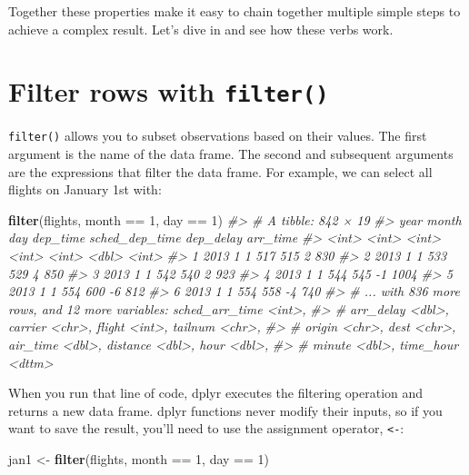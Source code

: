 \documentclass[]{book}
\newenvironment{Shaded}{\begin{snugshade}}{\end{snugshade}}
\newcommand{\KeywordTok}[1]{\textcolor[rgb]{0.13,0.29,0.53}{\textbf{{#1}}}}
\newcommand{\DecValTok}[1]{\textcolor[rgb]{0.00,0.00,0.81}{{#1}}}
\newcommand{\StringTok}[1]{\textcolor[rgb]{0.31,0.60,0.02}{{#1}}}
\newcommand{\CommentTok}[1]{\textcolor[rgb]{0.56,0.35,0.01}{\textit{{#1}}}}
\newcommand{\NormalTok}[1]{{#1}}
\begin{document}
Together these properties make it easy to chain together multiple simple
steps to achieve a complex result. Let's dive in and see how these verbs
work.

\section{\texorpdfstring{Filter rows with
\texttt{filter()}}{Filter rows with filter()}}\label{filter-rows-with-filter}

\texttt{filter()} allows you to subset observations based on their
values. The first argument is the name of the data frame. The second and
subsequent arguments are the expressions that filter the data frame. For
example, we can select all flights on January 1st with:

\begin{Shaded}
\begin{Highlighting}[]
\KeywordTok{filter}\NormalTok{(flights, month ==}\StringTok{ }\DecValTok{1}\NormalTok{, day ==}\StringTok{ }\DecValTok{1}\NormalTok{)}
\CommentTok{#> # A tibble: 842 × 19}
\CommentTok{#>    year month   day dep_time sched_dep_time dep_delay arr_time}
\CommentTok{#>   <int> <int> <int>    <int>          <int>     <dbl>    <int>}
\CommentTok{#> 1  2013     1     1      517            515         2      830}
\CommentTok{#> 2  2013     1     1      533            529         4      850}
\CommentTok{#> 3  2013     1     1      542            540         2      923}
\CommentTok{#> 4  2013     1     1      544            545        -1     1004}
\CommentTok{#> 5  2013     1     1      554            600        -6      812}
\CommentTok{#> 6  2013     1     1      554            558        -4      740}
\CommentTok{#> # ... with 836 more rows, and 12 more variables: sched_arr_time <int>,}
\CommentTok{#> #   arr_delay <dbl>, carrier <chr>, flight <int>, tailnum <chr>,}
\CommentTok{#> #   origin <chr>, dest <chr>, air_time <dbl>, distance <dbl>, hour <dbl>,}
\CommentTok{#> #   minute <dbl>, time_hour <dttm>}
\end{Highlighting}
\end{Shaded}

When you run that line of code, dplyr executes the filtering operation
and returns a new data frame. dplyr functions never modify their inputs,
so if you want to save the result, you'll need to use the assignment
operator, \texttt{\textless{}-}:

\begin{Shaded}
\begin{Highlighting}[]
\NormalTok{jan1 <-}\StringTok{ }\KeywordTok{filter}\NormalTok{(flights, month ==}\StringTok{ }\DecValTok{1}\NormalTok{, day ==}\StringTok{ }\DecValTok{1}\NormalTok{)}
\end{Highlighting}
\end{Shaded}
\end{document}
